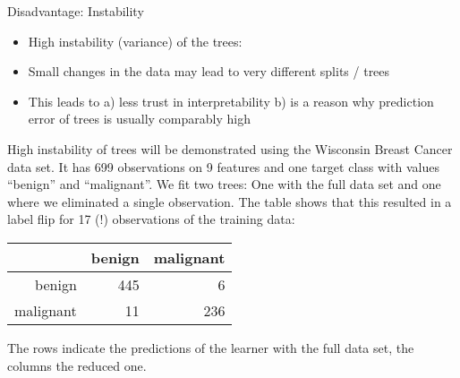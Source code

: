 \documentclass[11pt,compress,t,notes=noshow, xcolor=table]{beamer}
\begin{document}
 \begin{vbframe}{Disadvantage: Instability}
 \begin{itemize}
 \item High instability (variance) of the trees:
 \item Small changes in the data may lead to very different splits / trees
 \item This leads to a) less trust in interpretability b) is a reason why prediction error of trees is usually comparably high
 \end{itemize}

High instability of trees will be demonstrated using the Wisconsin Breast Cancer data set.
It has 699 observations on 9 features and one target class with values \enquote{benign} and \enquote{malignant}. We fit two trees: One with the full data set and one where we eliminated a single observation. The table shows that this resulted in a label flip for 17 (!) observations of the training data:

\begin{table}[ht]
\centering
\begin{tabular}{rrr}
  \hline
 & benign & malignant \\ 
  \hline
benign & 445 &   6 \\ 
  malignant &  11 & 236 \\ 
   \hline
\end{tabular}
\end{table}

The rows indicate the predictions of the learner with the full data set, the columns the reduced one.



\end{vbframe}
\end{document}
